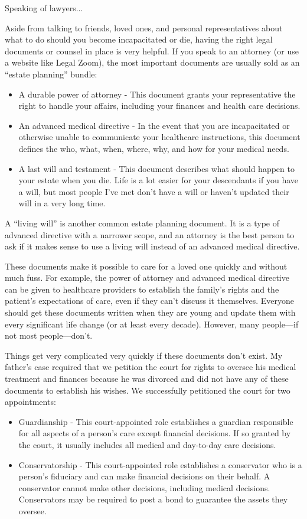 \documentclass{article}
\begin{document}
Speaking of lawyers...

Aside from talking to friends, loved ones, and personal representatives about what to do should you become incapacitated or die, having the right legal documents or counsel in place is very helpful. If you speak to an attorney (or use a website like Legal Zoom), the most important documents are usually sold as an ``estate planning'' bundle:

\begin{itemize}
    \item A durable power of attorney - This document grants your representative the right to handle your affairs, including your finances and health care decisions.
    \item An advanced medical directive - In the event that you are incapacitated or otherwise unable to communicate your healthcare instructions, this document defines the who, what, when, where, why, and how for your medical needs.
    \item A last will and testament - This document describes what should happen to your estate when you die. Life is a lot easier for your descendants if you have a will, but most people I've met don't have a will or haven't updated their will in a very long time.
\end{itemize}

A ``living will'' is another common estate planning document. It is a type of advanced directive with a narrower scope, and an attorney is the best person to ask if it makes sense to use a living will instead of an advanced medical directive.

These documents make it possible to care for a loved one quickly and without much fuss. For example, the power of attorney and advanced medical directive can be given to healthcare providers to establish the family's rights and the patient's expectations of care, even if they can't discuss it themselves. Everyone should get these documents written when they are young and update them with every significant life change (or at least every decade). However, many people—if not most people—don't. 

Things get very complicated very quickly if these documents don't exist. My father's case required that we petition the court for rights to oversee his medical treatment and finances because he was divorced and did not have any of these documents to establish his wishes. We successfully petitioned the court for two appointments:

\begin{itemize}
    \item Guardianship - This court-appointed role establishes a guardian responsible for all aspects of a person's care except financial decisions. If so granted by the court, it usually includes all medical and day-to-day care decisions.
    \item Conservatorship - This court-appointed role establishes a conservator who is a person's fiduciary and can make financial decisions on their behalf. A conservator cannot make other decisions, including medical decisions. Conservators may be required to post a bond to guarantee the assets they oversee.
\end{itemize}
\end{document}
